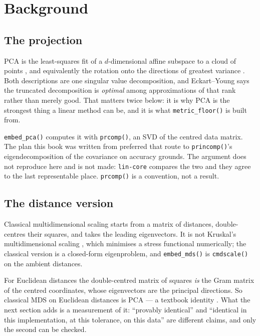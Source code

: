 \documentclass[
  british,
  a4paper,
]{book}
\begin{document}
\section{Background}\label{lin-background}

\subsection{The projection}\label{the-projection}

PCA is the least-squares fit of a \(d\)-dimensional affine subspace to a cloud of
points \citep{pearson1901lines}, and equivalently the rotation onto the directions of
greatest variance \citep{hotelling1933components}. Both descriptions are one singular
value decomposition, and Eckart--Young \citep{eckart1936approximation} says the
truncated decomposition is \emph{optimal} among approximations of that rank rather
than merely good. That matters twice below: it is why PCA is the strongest thing
a linear method can be, and it is what \texttt{metric\_floor()} is built from.

\texttt{embed\_pca()} computes it with \texttt{prcomp()}, an SVD of the centred data matrix. The
plan this book was written from preferred that route to \texttt{princomp()}'s
eigendecomposition of the covariance on accuracy grounds. The argument does not
reproduce here and is not made: \texttt{lin-core} compares the two and they agree to the
last representable place. \texttt{prcomp()} is a convention, not a result.

\subsection{The distance version}\label{the-distance-version}

Classical multidimensional scaling \citep{torgerson1952mds} starts from a matrix of
distances, double-centres their squares, and takes the leading eigenvectors. It
is not Kruskal's multidimensional scaling \citep{kruskal1964fit}, which minimises a
stress functional numerically; the classical version is a closed-form
eigenproblem, and \texttt{embed\_mds()} is \texttt{cmdscale()} on the ambient distances.

For Euclidean distances the double-centred matrix of squares \emph{is} the Gram matrix
of the centred coordinates, whose eigenvectors are the principal directions. So
classical MDS on Euclidean distances is PCA --- a textbook identity
\citep{lee2007nonlinear}. What the next section adds is a measurement of it: ``provably
identical'' and ``identical in this implementation, at this tolerance, on this
data'' are different claims, and only the second can be checked.
\end{document}
